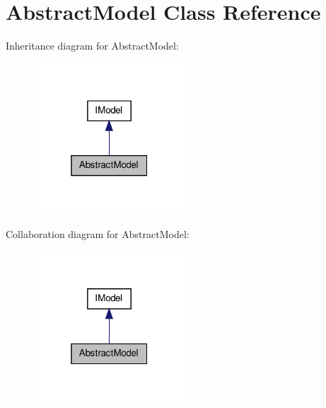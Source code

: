\hypertarget{class_sec_plus_1_1_abstract_model}{
\section{AbstractModel Class Reference}
\label{class_sec_plus_1_1_abstract_model}
}


Inheritance diagram for AbstractModel:\nopagebreak
\begin{figure}[H]
\begin{center}
\leavevmode
\includegraphics[width=160pt]{class_sec_plus_1_1_abstract_model__inherit__graph}
\end{center}
\end{figure}


Collaboration diagram for AbstractModel:\nopagebreak
\begin{figure}[H]
\begin{center}
\leavevmode
\includegraphics[width=160pt]{class_sec_plus_1_1_abstract_model__coll__graph}
\end{center}
\end{figure}
